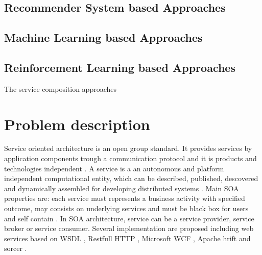 \documentclass[10pt,journal,compsoc]{IEEEtran}
\begin{document}
\subsection{Recommender System based Approaches}
\cite{Manikrao2005} \cite{ARASI2017} \cite{liu2009}

\subsection{Machine Learning based Approaches}

\subsection{Reinforcement Learning  based Approaches}
 \cite{Mostafa2015}  \cite{Wang2010}	

The service composition approaches 
\cite{ARASI2017}

\section{Problem description}
Service oriented architecture is an open group standard. It provides services by application components trough a communication protocol and it is products and technologies independent \cite{www.opengroup.org/standards/soa}. A service is a an autonomous and platform independent computational entity, which can be described, published, descovered and dynamically assembled for developing distributed systems \cite{Ezhil-Govindarajan-subbbarayan2016}.  Main SOA properties are: each service must represents a business activity with specified outcome, may consists on underlying services and must be black box for users and self contain \cite{https://en.wikipedia.org/wiki/Service-oriented_architecture}. 
In SOA architecture, service can be a service provider, service broker or service consumer. Several implementation are proposed including web services based on WSDL \cite{}, Restfull HTTP \cite{}, Microsoft WCF \cite{}, Apache hrift \cite{} and sorcer \cite{}. 
\end{document}
